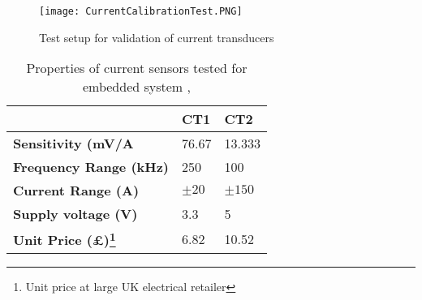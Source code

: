 \begin{figure}
    \centering
    \texttt{[image: CurrentCalibrationTest.PNG]}
    \caption{Test setup for validation of current transducers}
    \label{fig:CurrentCalibrationTest}
\end{figure}

\begin{savenotes}
\begin{table}
    \renewcommand{\arraystretch}{1.2}
	\begin{center}
	\begin{tabular}{lll}%
    	\toprule
        & \textbf{CT1} & \textbf{CT2}\\
        \midrule
        \textbf{Sensitivity (mV/A} & 76.67 & 13.333 \\
    	\textbf{Frequency Range (kHz)} & 250 & 100 \\
    	\textbf{Current Range (A)} & $\pm 20$ & $\pm 150$ \\
    	\textbf{Supply voltage (V)} & 3.3 & 5 \\
    	\textbf{Unit Price (£)\footnote{Unit price at large UK electrical retailer}} & 6.82 & 10.52 \\
        \bottomrule
    \end{tabular}
    \caption{Properties of current sensors tested for embedded system \cite{CT1}, \cite{CT2}}
    \label{tab:current_sensors}
    \end{center}
\end{table}
\end{savenotes}

